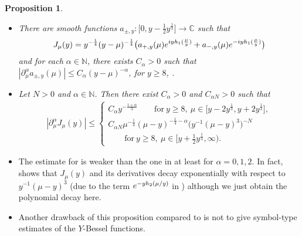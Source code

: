 \documentclass[10pt,a4paper]{article}
\numberwithin{equation}{section}
\newtheorem{Proposition}[Theorem]{Proposition}
 { \theoremstyle{definition}
\newtheorem{Definition}[Theorem]{Definition}
\newtheorem{Note}[Theorem]{Note}
\newtheorem{Example}[Theorem]{Example}
\newtheorem{Remark}[Theorem]{Remark} }
\def\a{\alpha}
\def\m{\mu}
\def\pa{\partial}
\begin{document}
\begin{Proposition}\label{Besselasymp}\quad
\begin{itemize}\itemsep=0pt
\item[$(i)$] There are smooth functions $a_{\pm,y}\colon \bigl[0,y-\frac{1}{2}y^{\frac{1}{3}}\bigr]\to \mathbb{C}$ such that
\begin{align*}
J_{\m}(y)=y^{-\frac{1}{4}}(y-\m)^{-\frac{1}{4}}\bigl(a_{+,y}(\m){\rm e}^{{\rm i}yh_1(\frac{\m}{y})}+a_{-,y}(\m){\rm e}^{-{\rm i}yh_1(\frac{\m}{y})} \bigr)
\end{align*}
and for each $\a\in\mathbb{N}$, there exists $C_{\a}>0$ such that
$
|\pa_{\m}^{\a}a_{\pm,y}(\m)|\leq C_{\a}(y-\m)^{-\a}$, for $ y\geq 8$, \smash{$ \m\in \bigl[0,y-\frac{1}{2}y^{\frac{1}{3}}\bigr]$}.
\item[$(ii)$] Let $N>0$ and $\a\in\mathbb{N}$. Then there exist $C_{\a}>0$ and $C_{\a N}>0$ such that
\begin{align*}
|\pa_{\m}^{\a}J_{\m}(y)|\leq \begin{cases}C_{\a}y^{-\frac{1+\a}{3}} \qquad \text{for}\  y\geq 8,\  \m\in \bigl[y-2y^{\frac{1}{3}},y+2y^{\frac{1}{3}}\bigr],\\
C_{\a N}\m^{-\frac{1}{4}}(\m-y)^{-\frac{1}{4}-\a} \bigl(y^{-1}(\m-y)^3 \bigr)^{-N} \\
\qquad \text{for}\  y\geq 8,\  \m\in \bigl[y+\frac{1}{2}y^{\frac{1}{3}},\infty\bigr).
\end{cases}
\end{align*}
\end{itemize}
\end{Proposition}

\begin{Remark}\quad
\begin{itemize}\itemsep=0pt
\item[(1)] The estimate for \smash{$\m\in \bigl[y+\frac{1}{2}y^{\frac{1}{3}},\infty\bigr)$} is weaker than the one in \cite[Theorem 9.1]{IJ} at least for $\a=0,1,2$. In fact, \cite[Theorem 9.1]{IJ} shows that $J_{\m}(y)$ and its derivatives decay exponentially with respect to $y^{-1}(\m-y)^3$ (due to the term ${\rm e}^{-yh_2(\m/y)}$ in \cite{IJ}) although we just obtain the polynomial decay here.

\item[(2)] Another drawback of this proposition compared to \cite[Theorem 9.1]{IJ} is not to give symbol-type estimates of the $Y$-Bessel functions.
\end{itemize}
\end{Remark}
\end{document}
